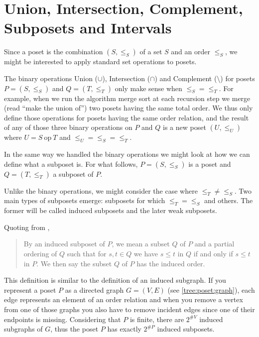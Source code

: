 \section{Union, Intersection, Complement, Subposets and Intervals}
\label{tree:poset:sub}


Since a poset is the combination $(S, \le_S)$ of a set $S$ and an order
$\le_S$, we might be interested to apply standard set operations to posets.

The binary operations Union ($\cup$), Intersection ($\cap$) and Complement
($\setminus$) for posets $P = (S, \le_S)$ and $Q = (T, \le_T)$ only make sense
when $\le_S = \le_T$. For example, when we run the algorithm merge sort at each
recursion step we merge (read ``make the union of'') two posets having the same
total order. We thus only define those operations for posets having the same
order relation, and the result of any of those three binary operations on $P$
and $Q$ is a new poset $(U, \le_U)$ where $U = S~\text{op}~T$ and $\le_U =
\le_S = \le_T$.


In the same way we handled the binary operations we might look at how we can
define what a subposet is. For what follows, $P = (S, \le_S)$ is a poset and $Q
= (T, \le_T)$ a subposet of $P$.

Unlike the binary operations, we might consider the case where $\le_T \neq
\le_S$. Two main types of subposets emerge: subposets for which $\le_T = \le_S$
and others. The former will be called induced subposets and the later weak
subposets.

Quoting from \cite{Stanley:2011:ECV:2124415},

\begin{quotation}

By an induced subposet of $P$, we mean a subset $Q$ of $P$ and a partial
ordering of $Q$ such that for $s, t \in Q$ we have $s \leq t$ in $Q$ if and
only if $s \leq t$ in $P$. We then say the subset $Q$ of $P$ has the induced
order.

\end{quotation}

This definition is similar to the definition of an induced subgraph. If you
represent a poset $P$ as a directed graph $G = (V, E)$ (see
\ref{tree:poset:graph}), each edge represents an element of an order relation
and when you remove a vertex from one of those graphs you also have to remove
incident edges since one of their endpoints is missing. Considering that $P$ is
finite, there are $2^{\#V}$ induced subgraphs of $G$, thus the poset $P$ has
exactly $2^{\#P}$ induced subposets.

